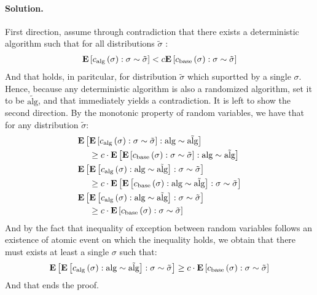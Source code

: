 \documentclass{article}
\begin{document}
\begin{multicols*}{2}
  \paragraph{Solution.} First direction, assume through contradiction that there exists a deterministic algorithm such that for all distributions $\tilde{\sigma}$ :
  \begin{equation*}
    \begin{split}
      \dsig{  \calg\left( \sigma \right)  } < c \dsig{ \cbase \left( \sigma \right)  }
    \end{split}
  \end{equation*} And that holds, in paritcular, for distribution $\tilde{\sigma}$ which suportted by a single $\sigma$. Hence, because any deterministic algorithm is also a randomized algorithm, set it to be $ \tilde{\text{alg}}$, and that immediately yields a contradiction. 
  It is left to show the second direction. By the monotonic property of random variables, we have that for any distribution $\tilde{\sigma}$: 
  \begin{equation*}
    \begin{split}
      &  \dalg{ \dsig{ \calg\left( \sigma \right) } } \\
      & \ \  \ \ \ge c \cdot \dalg{ \dsig{  \cbase\left( \sigma \right) } } \\
      & \dsig{ \dalg{ \calg\left( \sigma \right) } } \\
      &  \ \  \ \ \ge c \cdot \dsig{ \dalg{  \cbase\left( \sigma \right) } } \\
      & \dsig{ \dalg{ \calg\left( \sigma \right) } } \\
      & \ \ \ \  \ge c \cdot \dsig{  \cbase\left( \sigma \right) }  
    \end{split}
  \end{equation*}
  And by the fact that inequality of exception between random variables follows an existence of atomic event on which the inequality holds, we obtain that there must exists at least a single $\sigma$ such that:
  \begin{equation*}
    \begin{split}
      \dsig{ \dalg{ \calg\left( \sigma \right) } } \ge c \cdot \dsig{  \cbase\left( \sigma \right) }  
    \end{split}
  \end{equation*}
  And that ends the proof.
\end{multicols*}
\printbibliography 
\end{document}
